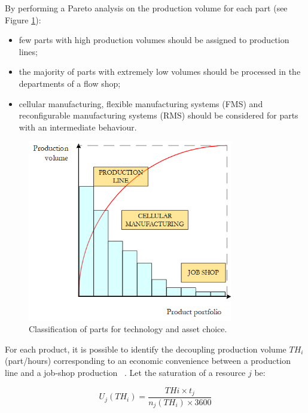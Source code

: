 By performing a Pareto analysis on the production volume for each part (see Figure \ref{fig_prod_flexauto2}):

\begin{itemize}
    \item few parts with high production volumes should be assigned to production lines;
    \item the majority of parts with extremely low volumes should be processed in the departments of a flow shop;
    \item cellular manufacturing, flexible manufacturing systems (FMS) and reconfigurable manufacturing systems (RMS) should be considered for parts with an intermediate behaviour.

\end{itemize}

\begin{figure}[hbt!]
\centering
\includegraphics[width=0.8\textwidth]{sectionProduction/design_plant_figures/fig_prod_flexauto2.png}
\captionsetup{type=figure}
\caption{Classification of parts for technology and asset choice.}
\label{fig_prod_flexauto2}
\end{figure}

For each product, it is possible to identify the decoupling production volume $TH_i$ (part/hours) corresponding to an economic convenience between a production line and a job-shop production ~\cite{Pareschi2007}. Let the saturation of a resource $j$ be:

\begin{equation}
    U_j\left(TH_i\right)=\frac{THi\times t_j}{n_j\left(TH_i\right)\times3600}
\end{equation}

